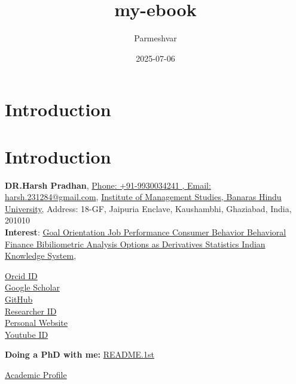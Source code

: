 \documentclass[
  letterpaper,
  DIV=11,
  numbers=noendperiod]{scrreprt}
\title{my-ebook}
\author{Parmeshvar}
\date{2025-07-06}
\renewcommand*\contentsname{Table of contents}
\newcommand\contentsname{Table of contents}
\begin{document}
\maketitle

\renewcommand*\contentsname{Table of contents}
{
\hypersetup{linkcolor=}
\setcounter{tocdepth}{2}
\tableofcontents
}


\chapter{Introduction}\label{introduction}


\chapter{Introduction}\label{introduction-1}

\textbf{DR.Harsh Pradhan},
\href{http://www.ling.uni-potsdam.de/en/}{Phone: +91-9930034241 , Email:
harsh.231284@gmail.com},
\href{http://www.uni-potsdam.de/en/university-of-potsdam.html}{Institute
of Management Studies, Banaras Hindu University}, Address: 18-GF,
Jaipuria Enclave, Kaushambhi, Ghaziabad, India, 201010\\
\textbf{Interest}:
\href{http://www.uni-potsdam.de/humfak/hum-forschungsschwerpunkte/forschungscluster-sprache.html}{Goal
Orientation Job Performance Consumer Behavior Behavioral Finance
Bibiliometric Analysis Options as Derivatives Statistics Indian
Knowledge System},

\href{https://orcid.org/0000-0002-3332-3610}{Orcid ID}\\
\href{https://scholar.google.com/citations?user=8l5MEd0AAAAJ&hl=en&oi=sra}{Google
Scholar}\\
\href{https://github.com/}{GitHub}\\
\href{https://www.webofscience.com/wos/author/record/AIB}{Researcher
ID}\\
\href{http://https//sites.google.com/view/harshpradhan/home\%20\%20,\%20\%20\%20\%20\%20shorturl.at/yzQSX}{Personal
Website}\\
\href{http://www.youtube.com/@dr.harshpradhan742}{Youtube ID}

\textbf{Doing a PhD with me:}
\href{http://www.ling.uni-potsdam.de/~vasishth/doingaphdwithme.html}{README.1st}

\href{https://bhu.ac.in/Site/FacultyProfile/1_5?FA000562}{Academic
Profile}
\end{document}
